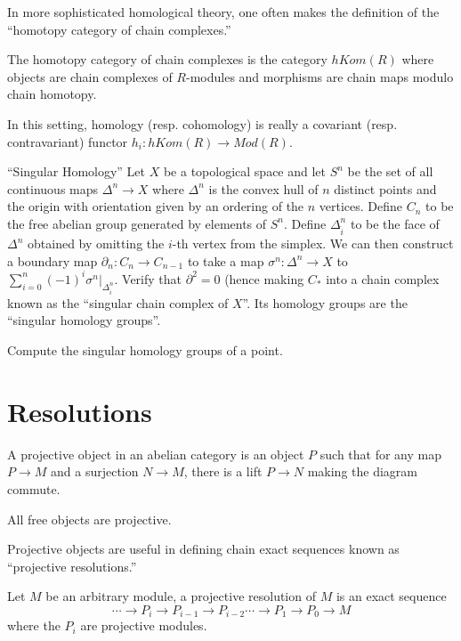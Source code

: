 In more sophisticated homological theory, one often makes the
definition of the ``homotopy category of chain complexes.''
\begin{definition} The homotopy category of chain complexes is
the category $hKom(R)$ where objects are chain complexes of
$R$-modules and morphisms are chain maps modulo chain homotopy.
\end{definition}

In this setting, homology (resp. cohomology) is really a
covariant (resp. contravariant) functor $h_i:hKom(R)\rightarrow
Mod(R)$.

\begin{exercise} ``Singular Homology'' Let $X$ be a topological
space and let $S^n$ be the set of all continuous maps
$\Delta^n\rightarrow X$ where $\Delta^n$ is the convex hull of
$n$ distinct points and the origin with orientation given by an
ordering of the $n$ vertices. Define $C_n$ to be the free
abelian group generated by elements of $S^n$. Define
$\Delta^n_{\hat{i}}$ to be the face of $\Delta^n$ obtained by
omitting the $i$-th vertex from the simplex. We can then
construct a boundary map $\partial_n:C_n\rightarrow C_{n-1}$ to
take a map $\sigma^n:\Delta^n\rightarrow X$ to
$\sum_{i=0}^n(-1)^i\sigma^n|_{\Delta^n_{\hat{i}}}$. Verify that
$\partial^2=0$ (hence making $C_*$ into a chain complex known as
the ``singular chain complex of $X$''. Its homology groups are
the ``singular homology groups''. \end{exercise}
\begin{exercise} Compute the singular homology groups of a
point. \end{exercise}

\section{Resolutions}
\begin{definition} A projective object in an abelian category is
an object $P$
such that for any map $P\rightarrow M$ and a surjection
$N\rightarrow M$, there
is a lift $P\rightarrow N$ making the diagram commute.
\end{definition}

\begin{example} All free objects are projective. \end{example}
Projective objects are useful in defining chain exact sequences
known as ``projective resolutions.''

\begin{definition} Let $M$ be an arbitrary module, a projective
resolution of
$M$ is an exact sequence
\begin{equation} \cdots\rightarrow P_i\rightarrow
P_{i-1}\rightarrow
P_{i-2}\cdots\rightarrow P_1\rightarrow P_0\rightarrow M
\end{equation} where
the $P_i$ are projective modules. \end{definition}


